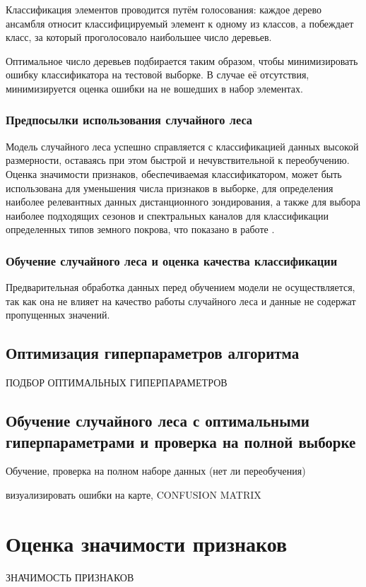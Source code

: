 \documentclass[14pt, a4paper, oneside]{extarticle}
\begin{document}
Классификация элементов проводится путём голосования: каждое дерево ансамбля относит классифицируемый элемент к одному из классов, а побеждает класс, за который проголосовало наибольшее число деревьев.

Оптимальное число деревьев подбирается таким образом, чтобы минимизировать ошибку классификатора на тестовой выборке. В случае её отсутствия, минимизируется оценка ошибки на не вошедших в набор элементах.

\subsubsection{Предпосылки использования случайного леса}
Модель случайного леса успешно справляется с классификацией данных высокой размерности, оставаясь при этом быстрой и нечувствительной к переобучению. Оценка значимости признаков, обеспечиваемая классификатором, может быть использована для уменьшения числа признаков в выборке, для определения наиболее релевантных данных дистанционного зондирования, а также для выбора наиболее подходящих сезонов и спектральных каналов для классификации определенных типов земного покрова, что показано в работе \cite{random-forest-in-remote-sensing}.

\subsubsection{Обучение случайного леса и оценка качества классификации}
Предварительная обработка данных перед обучением модели не осуществляется, так как она не влияет на качество работы случайного леса и данные не содержат пропущенных значений.

\subsection{Оптимизация гиперпараметров алгоритма}
ПОДБОР ОПТИМАЛЬНЫХ ГИПЕРПАРАМЕТРОВ

\subsection{Обучение случайного леса с оптимальными гиперпараметрами и проверка на полной выборке}
Обучение, проверка на полном наборе данных (нет ли переобучения)

визуализировать ошибки на карте, CONFUSION MATRIX
\newpage

\section{Оценка значимости признаков}
ЗНАЧИМОСТЬ ПРИЗНАКОВ
\end{document}
